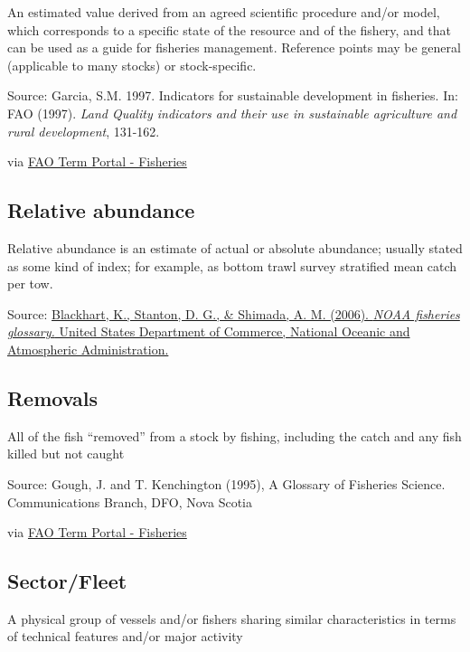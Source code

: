 \documentclass[
  11pt,
]{book}
\begin{document}
An estimated value derived from an agreed scientific procedure and/or model, which corresponds to a specific state of the resource and of the fishery, and that can be used as a guide for fisheries management. Reference points may be general (applicable to many stocks) or stock-specific.

Source: Garcia, S.M. 1997. Indicators for sustainable development in fisheries. In: FAO (1997). \emph{Land Quality indicators and their use in sustainable agriculture and rural development}, 131-162.

via \href{http://www.fao.org/fishery/glossary/en}{FAO Term Portal - Fisheries}

\hypertarget{relative-abundance}{%
\subsection{Relative abundance}\label{relative-abundance}}

Relative abundance is an estimate of actual or absolute abundance; usually stated as some kind of index; for example, as bottom trawl survey stratiﬁed mean catch per tow.

Source: \href{https://repository.library.noaa.gov/view/noaa/12856}{Blackhart, K., Stanton, D. G., \& Shimada, A. M. (2006). \emph{NOAA fisheries glossary.} United States Department of Commerce, National Oceanic and Atmospheric Administration.}

\hypertarget{removals}{%
\subsection{Removals}\label{removals}}

All of the fish ``removed'' from a stock by fishing, including the catch and any fish killed but not caught

Source: Gough, J. and T. Kenchington (1995), A Glossary of Fisheries Science. Communications Branch, DFO, Nova Scotia

via \href{http://www.fao.org/fishery/glossary/en}{FAO Term Portal - Fisheries}

\hypertarget{sectorfleet}{%
\subsection{Sector/Fleet}\label{sectorfleet}}

A physical group of vessels and/or fishers sharing similar characteristics in terms of technical features and/or major activity
\end{document}
